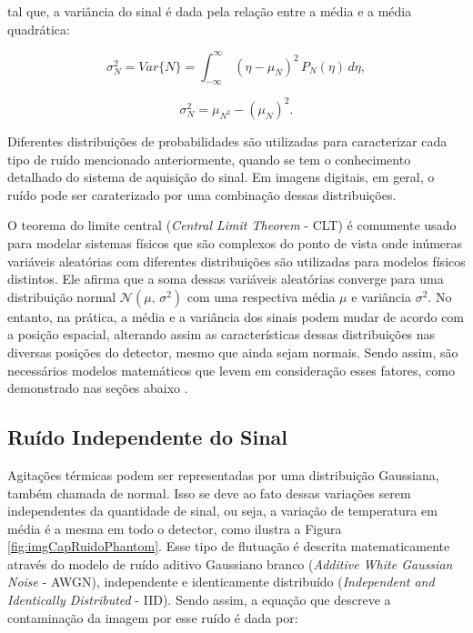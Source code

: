 \noindent tal que, a variância do sinal é dada pela relação entre a média e a média quadrática:

\begin{equation}
\sigma^{2}_{N} = Var\{N\}= {\int_{-\infty}^{\infty} \,(\eta -\mu_{N} )^{2} \, P_{N}(\eta) \, d\eta}, 
\label{eq:eqCapRuidoVariancia1}
\end{equation}

\begin{equation}
\sigma^{2}_{N}  = \mu_{N^{2}} - (\mu_{N} )^{2} .
\label{eq:eqCapRuidoVariancia2}
\end{equation}


Diferentes distribuições de probabilidades são utilizadas para caracterizar cada tipo de ruído mencionado anteriormente, quando se tem o conhecimento detalhado do sistema de aquisição do sinal. Em imagens digitais, em geral, o ruído pode ser caraterizado por uma combinação dessas distribuições.

O teorema do limite central (\textit{Central Limit Theorem} - \acs{CLT}) é comumente usado para modelar sistemas físicos que são complexos do ponto de vista onde inúmeras variáveis aleatórias com diferentes distribuições são utilizadas para modelos físicos distintos. Ele afirma que a soma dessas variáveis aleatórias converge para uma distribuição normal $\mathcal{N}(\mu,\,\sigma^{2})$ com uma respectiva média $\mu$ e variância $\sigma^{2}$. No entanto, na prática, a média e a variância dos sinais podem mudar de acordo com a posição espacial, alterando assim as características dessas distribuições nas diversas posições do detector, mesmo que ainda sejam normais. Sendo assim, são necessários modelos matemáticos que levem em consideração esses fatores, como demonstrado nas seções abaixo \cite{bertalmiodenoising2018}.


\subsection{Ruído Independente do Sinal}

Agitações térmicas podem ser representadas por uma distribuição Gaussiana, também chamada de normal. Isso se deve ao fato dessas variações serem independentes da quantidade de sinal, ou seja, a variação de temperatura em média é a mesma em todo o detector, como ilustra a Figura \ref{fig:imgCapRuidoPhantom}. Esse tipo de flutuação é descrita matematicamente através do modelo de ruído aditivo Gaussiano branco  (\textit{Additive White Gaussian Noise} - \acs{AWGN}), independente e identicamente distribuído (\textit{Independent and Identically Distributed} - \acs{IID}). Sendo assim, a equação que descreve a contaminação da imagem por esse ruído é dada por:


